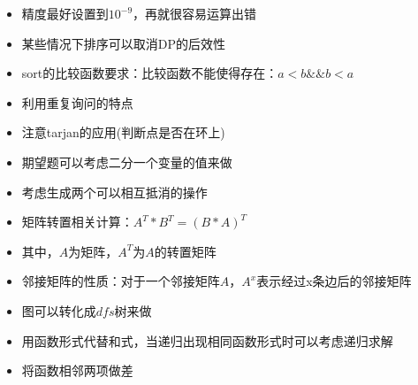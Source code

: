 \documentclass[a4paper]{article}
\begin{document}
\begin{itemize}
		\item 精度最好设置到$10^{-9}$，再就很容易运算出错
		
		\item 某些情况下排序可以取消DP的后效性
		
		\item sort的比较函数要求：比较函数不能使得存在：$a < b \&\& b < a$
		
		\item 利用重复询问的特点
		
		\item 注意tarjan的应用(判断点是否在环上)
		
		\item 期望题可以考虑二分一个变量的值来做
		
		\item 考虑生成两个可以相互抵消的操作
		
		\item 矩阵转置相关计算：$A^T * B^T = (B * A)^T$
		
		\item 其中，$A$为矩阵，$A^T$为$A$的转置矩阵
		
		\item 邻接矩阵的性质：对于一个邻接矩阵$A$，$A^x$表示经过x条边后的邻接矩阵
		
		\item 图可以转化成$dfs$树来做
		
		\item 用函数形式代替和式，当递归出现相同函数形式时可以考虑递归求解
		
		\item 将函数相邻两项做差
		
		\end{itemize}
		
\end{document}
